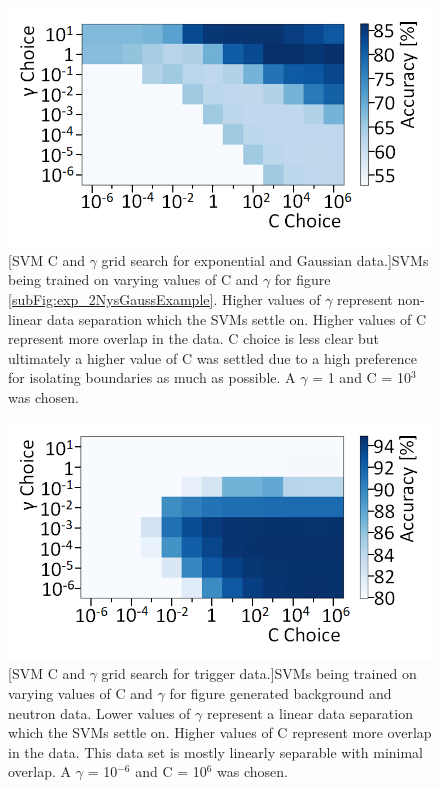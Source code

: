 \begin{figure}[!h]
\centering
\begin{minipage}{.45\textwidth}
  \centering
  \includegraphics[width=\linewidth]{Chapter4/Figs/Raster/GammaCGridSearchExp2Gauss_adjustMedText.png}
  [SVM C and $\gamma$ grid search for exponential and Gaussian data.]{SVMs being trained on varying values of C and $\gamma$ for figure \ref{subFig:exp_2NysGaussExample}. Higher values of $\gamma$ represent non-linear data separation which the SVMs settle on. Higher values of C represent more overlap in the data. C choice is less clear but ultimately a higher value of C was settled due to a high preference for isolating boundaries as much as possible. A $\gamma$ = 1 and C = 10$^3$ was chosen.} 
  \label{fig:GammaCGridSearchExp2Gauss}
\end{minipage}%
\qquad
\begin{minipage}{.45\textwidth}
  \centering
  \includegraphics[width=\linewidth]{Chapter4/Figs/Raster/GammaCGridSearchNeutron_adjustMedText.png}
  [SVM C and $\gamma$ grid search for trigger data.]{SVMs being trained on varying values of C and $\gamma$ for figure generated background and neutron data. Lower values of $\gamma$ represent a linear data separation which the SVMs settle on. Higher values of C represent more overlap in the data. This data set is mostly linearly separable with minimal overlap. A $\gamma$ = 10$^{-6}$ and C = 10$^6$ was chosen.}
  \vspace{0.478cm} %
  \label{fig:GammaCGridSearchNeutron}
\end{minipage}
\end{figure}

